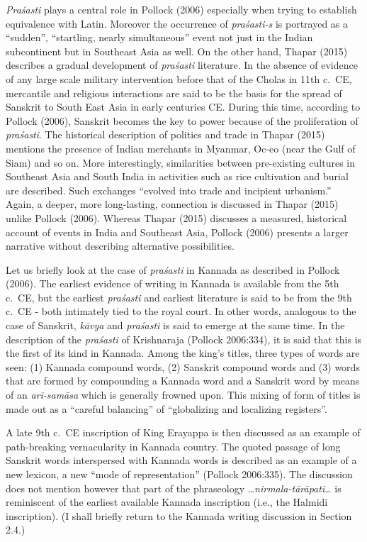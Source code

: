 {\sl Praśasti} plays a central role in Pollock (2006) especially when trying to establish equivalence with Latin. Moreover the occurrence of {\sl praśasti-s} is portrayed as a “sudden”, “startling, nearly simultaneous” event not just in the Indian subcontinent but in Southeast Asia as well. On the other hand, Thapar (2015) describes a gradual development of {\sl praśasti} literature. In the absence of evidence of any large scale military intervention before that of the Cholas in 11th c.\ CE, mercantile and religious interactions are said to be the basis for the spread of Sanskrit to South East Asia in early centuries CE. During this time, according to Pollock (2006), Sanskrit becomes the key to power because of the proliferation of {\sl praśasti}. The historical description of politics and trade in Thapar (2015) mentions the presence of Indian merchants in Myanmar, Oc-eo (near the Gulf of Siam) and so on. More interestingly, similarities between pre-existing cultures in Southeast Asia and South India in activities such as rice cultivation and burial are described. Such exchanges “evolved into trade and incipient urbanism.” Again, a deeper, more long-lasting, connection is discussed in Thapar (2015) unlike Pollock (2006). Whereas Thapar (2015) discusses a measured, historical account of events in India and Southeast Asia, Pollock (2006) presents a larger narrative without describing alternative possibilities.

Let us briefly look at the case of {\sl praśasti} in Kannada as described in Pollock (2006). The earliest evidence of writing in Kannada is available from the 5th c.\ CE, but the earliest {\sl praśasti} and earliest literature is said to be from the 9th c.\ CE - both intimately tied to the royal court. In other words, analogous to the case of Sanskrit, {\sl kāvya} and {\sl praśasti} is said to emerge at the same time. In the description of the {\sl praśasti} of Krishnaraja (Pollock 2006:334), it is said that this is the first of its kind in Kannada. Among the king’s titles, three types of words are seen: (1) Kannada compound words, (2) Sanskrit compound words and (3) words that are formed by compounding a Kannada word and a Sanskrit word by means of an {\sl ari-samāsa} which is generally frowned upon. This mixing of form of titles is made out as a “careful balancing” of “globalizing and localizing registers”.

A late 9th c.\ CE inscription of King Erayappa is then discussed as an example of path-breaking vernacularity in Kannada country. The quoted passage of long Sanskrit words interspersed with Kannada words is described as an example of a new lexicon, a new “mode of representation” (Pollock 2006:335). The discussion does not mention however that part of the phraseology …{\sl nirmala-tārāpati}… is reminiscent of the earliest available Kannada inscription (i.e., the Halmidi inscription). (I shall briefly return to the Kannada writing discussion in Section 2.4.) 

